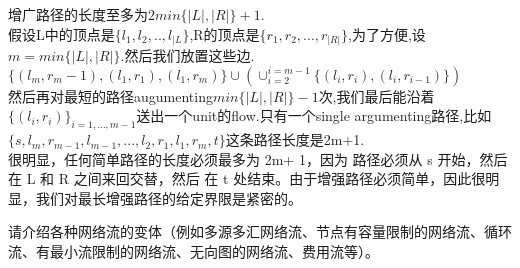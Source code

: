 \documentclass[a4paper, justified]{tufte-handout}
\begin{document}
\begin{solution}
  增广路径的长度至多为$2min\{|L|,|R|\}+1$.\\
  假设L中的顶点是$\{l_1,l_2,..,l_{|L}\}$,R的顶点是$\{r_1,r_2,...,r_{|R|}\}$,为了方便,设$m=min\{|L|,|R|\}$.然后我们放置这些边.\\
  $\{(l_m,r_m-1),(l_1,r_1),(l_1,r_m)\}\cup(\cup^{i=m-1}_{i=2}\{(l_i,r_i),(l_i,r_{i-1})\})$\\
  然后再对最短的路径augumenting$min\{|L|,|R|\}-1$次,我们最后能沿着$\{(l_i,r_i)\}_{i=1,...,m-1}$送出一个unit的flow.只有一个single argumenting路径,比如$\{s,l_m,r_{m-1},l_{m-1},...,l_2,r_1,l_1,r_m,t\}$这条路径长度是2m+1.\\
  很明显，任何简单路径的长度必须最多为 2m+ 1，因为
  路径必须从 s 开始，然后在 L 和 R 之间来回交替，然后
  在 t 处结束。由于增强路径必须简单，因此很明显，我们对最长增强路径的给定界限是紧密的。
\end{solution}

\beginot

\begin{problem}[TC Problem 26-1]
\end{problem}

\begin{solution}
\end{solution}
\begin{ot}

\end{ot}


\begin{ot}[网络流的各种变体]
  请介绍各种网络流的变体（例如多源多汇网络流、节点有容量限制的网络流、循环流、有最小流限制的网络流、无向图的网络流、费用流等）。

\end{ot}





% 
\end{document}
